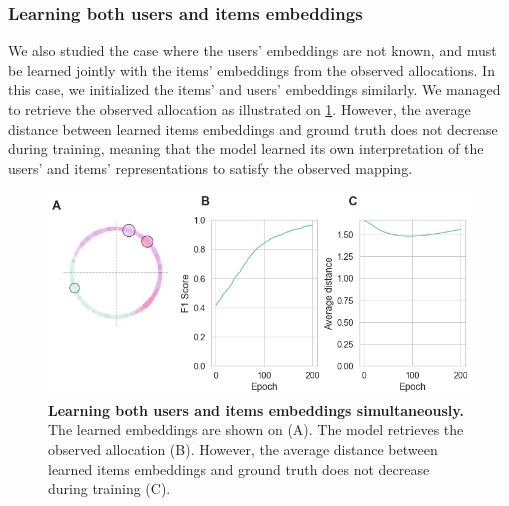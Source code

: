 \subsubsection*{Learning both users and items embeddings}

We also studied the case where the users' embeddings are not known, and must be learned jointly with the items' embeddings from the observed allocations. In this case, we initialized the items' and users' embeddings similarly. We managed to retrieve the observed allocation as illustrated on \cref{fig:experiment_learn_users_embeddings}. However, the average distance between learned items embeddings and ground truth does not decrease during training, meaning that the model learned its own interpretation of the users' and items' representations to satisfy the observed mapping.

\begin{figure}[h]
    \centering
    \includegraphics[width=.9\columnwidth]{images/simca/experiment_learn_both_embeddings.png}
    \caption{
        \textbf{Learning both users and items embeddings simultaneously.} The learned embeddings are shown on (A). The model retrieves the observed allocation (B). However, the average distance between learned items embeddings and ground truth does not decrease during training (C).
    }
    \label{fig:experiment_learn_users_embeddings}
\end{figure}
